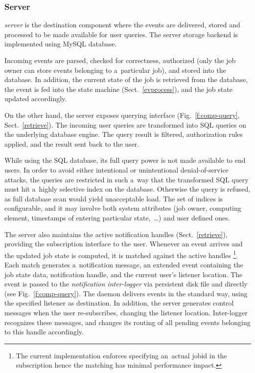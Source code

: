 \subsubsection{Server}
\label{server}
\emph{\LB server} is the destination component where the events are delivered,
stored and processed to be made available for user queries.
The server storage backend is implemented using MySQL database.

Incoming events are parsed, checked for correctness, authorized (only the job
owner can store events belonging to a~particular job), and stored into the
database.
In addition, the current state of the job is retrieved from the database,
the event is fed
into the state machine (Sect.~\ref{evprocess}), and the job state updated
accordingly.

On the other hand, the server exposes querying interface (Fig.~\ref{f:comp-query}, Sect.~\ref{retrieve}).
The incoming user queries are transformed into SQL queries on the underlying
database engine.
The query result is filtered, authorization rules applied, and the result
sent back to the user.

While using the SQL database, its full query power is not made available
to end users. 
In order to avoid either intentional or unintentional denial-of-service
attacks, the queries are restricted in such a~way that the transformed SQL
query must hit a~highly selective index on the database.
Otherwise the query is refused, as full database scan would yield unacceptable
load.
The set of indices is configurable, and it may involve both \LB system
attributes (\eg job owner, computing element,
timestamps of entering particular state,~\dots) and user defined ones.

The server also maintains the active notification handles
(Sect.~\ref{retrieve}), providing the subscription interface to the user.
Whenever an event arrives and the updated job state is computed,
it is matched against the active handles%
\footnote{The current implementation enforces specifying an~actual jobid
in the subscription hence the matching has minimal performance impact.}.
Each match generates a~notification message, an extended \LB event
containing the job state data, notification handle,
and the current user's listener location.
The event is passed to the \emph{notification inter-logger} 
via persistent disk file and directly (see Fig.~\ref{f:comp-query}).
The daemon delivers events in the standard way, using the specified
listener as destination.
In addition, the server generates control messages when the user re-subscribes,
changing the listener location.
Inter-logger recognizes these messages, and changes its routing of all
pending events belonging to this handle accordingly.


